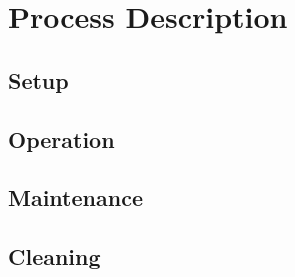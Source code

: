 \section{Process Description}
\subsection{Setup}
\subsection{Operation}
\subsection{Maintenance}
\subsection{Cleaning}